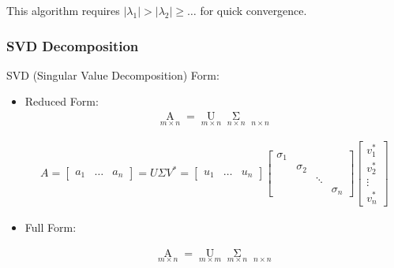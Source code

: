     This algorithm requires $ |\lambda _1|>|\lambda _2|\geq\ldots  $ for quick convergence.
    













\subsubsection{SVD Decomposition}
\begin{point}
    SVD (Singular Value Decomposition) Form:
\end{point}

    
\begin{itemize}[topsep=2pt,itemsep=0pt]
    \item Reduced Form:
\begin{align}
    \mathop{A}\limits_{m\times n} =\mathop{U}\limits_{m\times n}\mathop{\Sigma }\limits_{n\times n}\mathop{V^*}\limits_{n\times n}     
\end{align}

\begin{align}
    A=\begin{bmatrix}
        a_1&\ldots &a_n
    \end{bmatrix} 
    =U\Sigma V^*=
    \begin{bmatrix}
        u_1&\ldots&u_n
    \end{bmatrix}
    \begin{bmatrix}
        \sigma_1&&&\\
        &\sigma_2&&\\
        &&\ddots&\\
        &&&\sigma_n
    \end{bmatrix}
    \begin{bmatrix}
        v_1^*\\
        v_2^*\\
        \vdots\\
        v_n^*
    \end{bmatrix}
\end{align}
    \item Full Form:

    \begin{align}
        \mathop{A}\limits_{m\times n} =\mathop{U}\limits_{m\times m}\mathop{\Sigma }\limits_{m\times n}\mathop{V^*}\limits_{n\times n}     
    \end{align}
    

\end{itemize}

